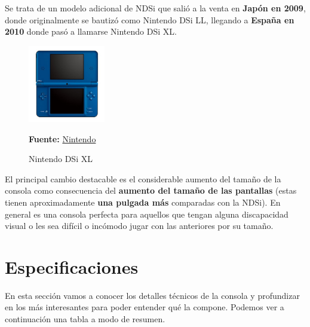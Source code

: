 Se trata de un modelo adicional de NDSi que salió a la venta en \textbf{Japón en 2009}, donde originalmente se bautizó como Nintendo DSi LL, llegando a \textbf{España en 2010} donde pasó a llamarse Nintendo DSi XL.

\vspace{0.5cm}

\begin{figure}[htbp]
\centering
  \includegraphics[width=0.3\textwidth]{archivos/ndsixl.jpg}
  \caption{Nintendo DSi XL}
    \textbf{Fuente:} \href{https://www.nintendo.co.uk/Nintendo-DS/Nintendo-DS-Family-Nintendo-UK-s-official-site-Nintendo-DS-Nintendo-DSi-Nintendo-DSi-XL-116380.html}{Nintendo}
  \label{fig:ndsixl} %
\end{figure}

\vspace{0.5cm}

El principal cambio destacable es el considerable aumento del tamaño de la consola como consecuencia del \textbf{aumento del tamaño de las pantallas} (estas tienen aproximadamente \textbf{una pulgada más} comparadas con la NDSi). En general es una consola perfecta para aquellos que tengan alguna discapacidad visual o les sea difícil o incómodo jugar con las anteriores por su tamaño.

\vspace{1cm}

\section{Especificaciones}

En esta sección vamos a conocer los detalles técnicos de la consola y profundizar en los más interesantes para poder entender qué la compone. Podemos ver a continuación una tabla a modo de resumen.

\vspace{0.5cm}


